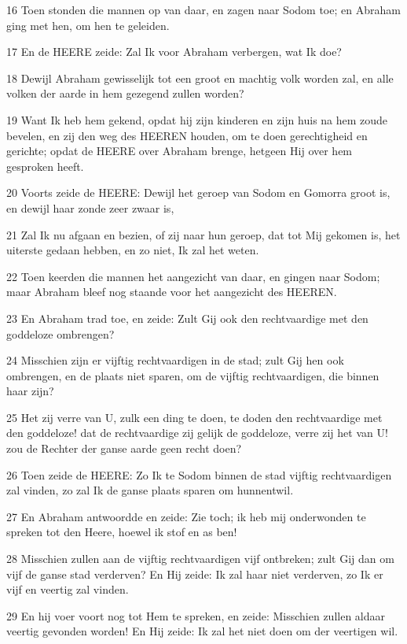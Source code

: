 \par 16 Toen stonden die mannen op van daar, en zagen naar Sodom toe; en Abraham ging met hen, om hen te geleiden.
\par 17 En de HEERE zeide: Zal Ik voor Abraham verbergen, wat Ik doe?
\par 18 Dewijl Abraham gewisselijk tot een groot en machtig volk worden zal, en alle volken der aarde in hem gezegend zullen worden?
\par 19 Want Ik heb hem gekend, opdat hij zijn kinderen en zijn huis na hem zoude bevelen, en zij den weg des HEEREN houden, om te doen gerechtigheid en gerichte; opdat de HEERE over Abraham brenge, hetgeen Hij over hem gesproken heeft.
\par 20 Voorts zeide de HEERE: Dewijl het geroep van Sodom en Gomorra groot is, en dewijl haar zonde zeer zwaar is,
\par 21 Zal Ik nu afgaan en bezien, of zij naar hun geroep, dat tot Mij gekomen is, het uiterste gedaan hebben, en zo niet, Ik zal het weten.
\par 22 Toen keerden die mannen het aangezicht van daar, en gingen naar Sodom; maar Abraham bleef nog staande voor het aangezicht des HEEREN.
\par 23 En Abraham trad toe, en zeide: Zult Gij ook den rechtvaardige met den goddeloze ombrengen?
\par 24 Misschien zijn er vijftig rechtvaardigen in de stad; zult Gij hen ook ombrengen, en de plaats niet sparen, om de vijftig rechtvaardigen, die binnen haar zijn?
\par 25 Het zij verre van U, zulk een ding te doen, te doden den rechtvaardige met den goddeloze! dat de rechtvaardige zij gelijk de goddeloze, verre zij het van U! zou de Rechter der ganse aarde geen recht doen?
\par 26 Toen zeide de HEERE: Zo Ik te Sodom binnen de stad vijftig rechtvaardigen zal vinden, zo zal Ik de ganse plaats sparen om hunnentwil.
\par 27 En Abraham antwoordde en zeide: Zie toch; ik heb mij onderwonden te spreken tot den Heere, hoewel ik stof en as ben!
\par 28 Misschien zullen aan de vijftig rechtvaardigen vijf ontbreken; zult Gij dan om vijf de ganse stad verderven? En Hij zeide: Ik zal haar niet verderven, zo Ik er vijf en veertig zal vinden.
\par 29 En hij voer voort nog tot Hem te spreken, en zeide: Misschien zullen aldaar veertig gevonden worden! En Hij zeide: Ik zal het niet doen om der veertigen wil.

